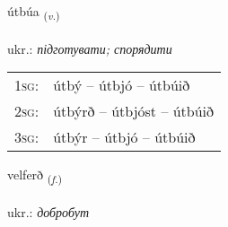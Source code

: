 \documentclass[frontgrid, backgrid]{flacards}\usepackage[]{graphicx}\usepackage[]{xcolor}
\begin{document}
\renewcommand{\flhead}{\vskip5pt \fboxsep=0pt {\small\bfseries\footnotesize Sagnorð | дієслово}}
\renewcommand{\fcfoot}{\vskip5pt \fboxsep=0pt \hspace{2pt}{\small\bfseries\footnotesize 3K}}

\renewcommand{\blhead}{\vskip5pt {\small\bfseries\footnotesize Sagnorð | дієслово }}
\renewcommand{\bcfoot}{\vskip5pt \hspace{2pt}{\small\bfseries\footnotesize 3K}}


{útbúa \small{\textsubscript{(\textit{v.})}} \\[1ex] %
\textphonetic{[uːtpua]} \\
ukr.: \emph{підготувати; спорядити} \\  [2ex]
\renewcommand*{\arraystretch}{0.8}
\begin{tabular}{p{1cm}l}
\textsc{1sg}: & útbý -- útbjó -- útbúið \\ 
\textsc{2sg}: & útbýrð -- útbjóst -- útbúið \\ 
\textsc{3sg}: & útbýr -- útbjó -- útbúið \\ 
\end{tabular}
}

\renewcommand{\flhead}{\vskip5pt \fboxsep=0pt {\small\bfseries\footnotesize Nafnorð | іменник}}
\renewcommand{\fcfoot}{\vskip5pt \fboxsep=0pt \hspace{2pt}{\small\bfseries\footnotesize 3K}}

\renewcommand{\blhead}{\vskip5pt {\small\bfseries\footnotesize Nafnorð | іменник }}
\renewcommand{\bcfoot}{\vskip5pt \hspace{2pt}{\small\bfseries\footnotesize 3K}}


{velferð \small{\textsubscript{(\textit{f.})}} \\[1ex] %
\textphonetic{[vɛlfɛrð]} \\
ukr.: \emph{добробут} \\  [2ex]
\renewcommand*{\arraystretch}{0.8}
}
\end{document}
